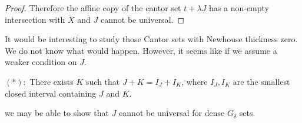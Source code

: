 \begin{proof}
Therefore the affine copy of the cantor set $t + \lambda J$ has a non-empty intersection with $X$ and $J$ cannot be universal.

\end{proof}

It would be interesting to study those Cantor sets with Newhouse thickness zero. We do not  know what would happen. However, it seems like if we assume a weaker condition on $J$. 

\medskip

\noindent $(\ast):$ There exists $K$ such that $J+K = I_J+I_K$, where $I_J,I_K$ are the  smallest closed interval containing $J$ and $K$. 

\medskip

we  may be able to show that  $J$  cannot be  universal for dense $G_{\delta}$ sets. 
